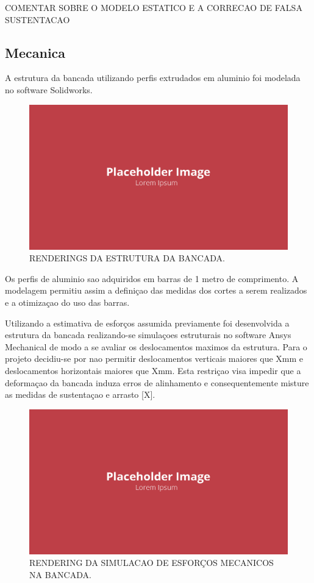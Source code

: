 COMENTAR SOBRE O MODELO ESTATICO E A CORRECAO DE FALSA SUSTENTACAO

\subsection{Mecanica}

A estrutura da bancada utilizando perfis extrudados em aluminio foi modelada no software Solidworks.

\begin{figure}[!ht]
    \centering
    \includegraphics[width=.8\linewidth]{figuras/placeholder.png}
    \caption{RENDERINGS DA ESTRUTURA DA BANCADA\cite{autor}.}
    \label{fig:placeholder}
\end{figure}

Os perfis de aluminio sao adquiridos em barras de 1 metro de comprimento. A modelagem permitiu assim a definiçao das medidas dos cortes a serem realizados e a otimizaçao do uso das barras.

Utilizando a estimativa de esforços assumida previamente foi desenvolvida a estrutura da bancada realizando-se simulaçoes estruturais no software Ansys Mechanical de modo a se avaliar os deslocamentos maximos da estrutura. Para o projeto decidiu-se por nao permitir deslocamentos verticais maiores que Xmm e deslocamentos horizontais maiores que Xmm. Esta restriçao visa impedir que a deformaçao da bancada induza erros de alinhamento e consequentemente misture as medidas de sustentaçao e arrasto [X].

\begin{figure}[!ht]
    \centering
    \includegraphics[width=.8\linewidth]{figuras/placeholder.png}
    \caption{RENDERING DA SIMULACAO DE ESFORÇOS MECANICOS NA BANCADA\cite{autor}.}
    \label{fig:placeholder}
\end{figure}

